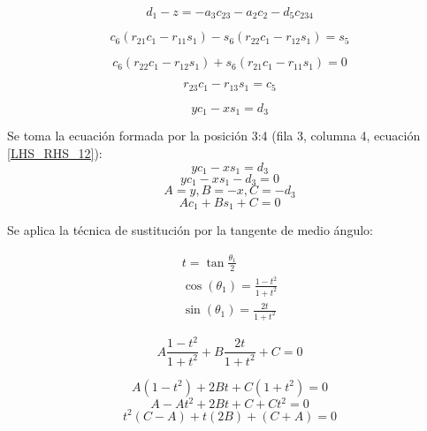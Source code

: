 \documentclass{article}
\begin{document}
\begin{equation}
d_1- z = - a_3 c_{23} - a_2 c_2 - d_5 c_{234}
\label{LHS_RHS_8}
\end{equation}

\begin{equation}
c_6 (r_{21}c_1 - r_{11}s_1) - s_6 (r_{22}c_1 - r_{12}s_1) = s_5
\label{LHS_RHS_9}
\end{equation}

\begin{equation}
c_6 (r_{22}c_1 - r_{12}s_1) + s_6 (r_{21}c_1 - r_{11}s_1) = 0
\label{LHS_RHS_10}
\end{equation}

\begin{equation}
r_{23}c_1 - r_{13}s_1 = c_5
\label{LHS_RHS_11}
\end{equation}

\begin{equation}
y c_1 - x s_1 = d_3
\label{LHS_RHS_12}
\end{equation}

Se toma la ecuación formada por la posición 3:4 (fila 3, columna 4, ecuación \ref{LHS_RHS_12}): 
\begin{equation}
yc_1-xs_1=d_3
\end{equation}
\begin{equation}
yc_1-xs_1-d_3=0    
\end{equation}
\begin{equation}
A = y, B = -x, C=-d_3    
\end{equation}
\begin{equation}
    Ac_1+Bs_1+C=0
\end{equation}

Se aplica la técnica de sustitución por la tangente de medio ángulo:

\begin{equation}
\label{eq:tangente_medio_angulo}
    \begin{gathered}
        t=\tan{\frac{\theta_1}{2}}\\
        \cos(\theta_1)=\frac{1-t^2}{1+t^2}\\
        \sin(\theta_1)=\frac{2t}{1+t^2}
    \end{gathered}
\end{equation}

\begin{equation}
    A\frac{1-t^2}{1+t^2}+B\frac{2t}{1+t^2}+C=0
\end{equation}

\begin{equation}
    A(1-t^2)+2Bt+C(1+t^2)=0
\end{equation}
\begin{equation}
    A-At^2+2Bt+C+Ct^2=0
\end{equation}
\begin{equation}
    t^2(C-A)+t(2B)+(C+A)=0
\end{equation}
\end{document}
